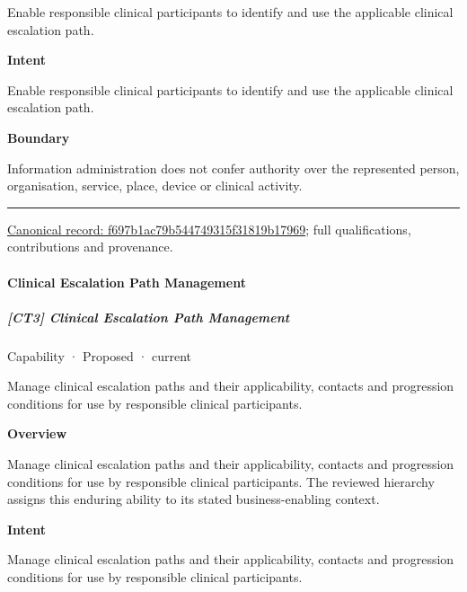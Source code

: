 Enable responsible clinical participants to identify and use the applicable clinical escalation path.



\textbf{Intent}



Enable responsible clinical participants to identify and use the applicable clinical escalation path.



\textbf{Boundary}



Information administration does not confer authority over the represented person, organisation, service, place, device or clinical activity.



\medskip\hrule\medskip

{\footnotesize \href{../../../../continuum/strategy/capability/f697b1ac79b544749315f31819b17969.md}{Canonical record: f697b1ac79b544749315f31819b17969}; full qualifications, contributions and provenance.}\par
\paragraph{Clinical Escalation Path Management}

\subparagraph{[CT3] Clinical Escalation Path Management}

\label{element:cca86a32ba8c4dda84caeaa248e9f444}
{\small Capability · Proposed · current}\par

Manage clinical escalation paths and their applicability, contacts and progression conditions for use by responsible clinical participants.



\textbf{Overview}



Manage clinical escalation paths and their applicability, contacts and progression conditions for use by responsible clinical participants. The reviewed hierarchy assigns this enduring ability to its stated business-enabling context.



\textbf{Intent}



Manage clinical escalation paths and their applicability, contacts and progression conditions for use by responsible clinical participants.



